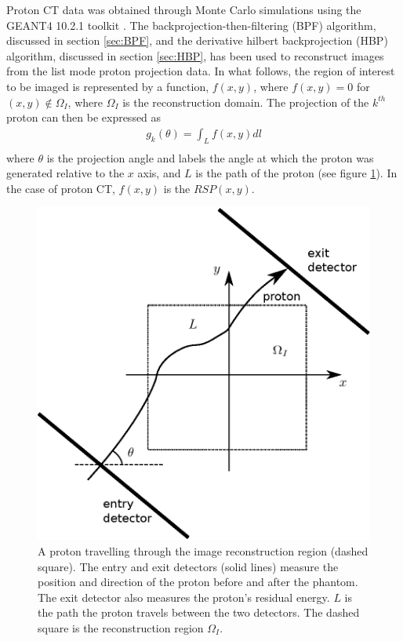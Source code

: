 \documentclass[11pt,a4paper]{article}
\begin{document}
Proton CT data was obtained through Monte Carlo simulations using the GEANT4 10.2.1 toolkit \parencite{agostinelli2003geant4}. The backprojection-then-filtering (BPF) algorithm, discussed in section \ref{sec:BPF}, and the derivative hilbert backprojection (HBP) algorithm, discussed in section \ref{sec:HBP}, has been used to reconstruct images from the list mode proton projection data. In what follows, the region of interest to be imaged is represented by a function, $f(x,y)$, where $f(x,y) = 0$ for $(x,y) \not\in \Omega_I$, where $\Omega_I$ is the reconstruction domain. The projection of the $k^{th}$ proton can then be expressed as
\begin{eqnarray}
g_{k}(\theta) = \int_{L} f(x,y) dl \\
\label{radon}
\end{eqnarray}
where $\theta$ is the projection angle and labels the angle at which the proton was generated relative to the $x$ axis, and $L$ is the path of the proton (see figure \ref{fig:param}). In the case of proton CT, $f(x,y)$ is the $RSP(x,y)$.
\begin{figure}[!htb]
\centering
\includegraphics[scale=0.7]{img/param2.eps}
\caption{A proton travelling through the image reconstruction region (dashed square). The entry and exit detectors (solid lines) measure the position and direction of the proton before and after the phantom. The exit detector also measures the proton's residual energy. $L$ is the path the proton travels between the two detectors. The dashed square is the reconstruction region $\Omega_I$.}
\label{fig:param}
\end{figure}
\end{document}

